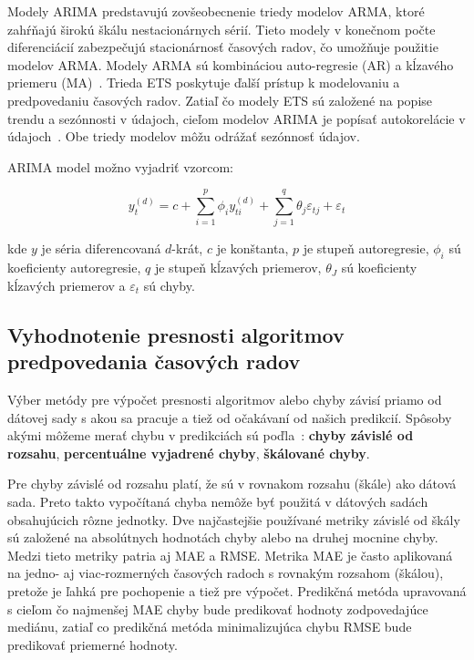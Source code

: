 \documentclass[thesismargins, thesislinespacing, openright, upjsfrontpage, combineabstracts]{rnthesis}
\begin{document}
Modely ARIMA predstavujú zovšeobecnenie triedy modelov ARMA, ktoré zahŕňajú širokú škálu nestacionárnych sérií. Tieto modely v konečnom počte diferenciácií zabezpečujú stacionárnosť časových radov, čo umožňuje použitie modelov ARMA. Modely ARMA sú kombináciou auto-regresie (AR) a kĺzavého priemeru (MA)~\cite{box2015time}. Trieda ETS poskytuje ďalší prístup k modelovaniu a predpovedaniu časových radov. Zatiaľ čo modely ETS sú založené na popise trendu a sezónnosti v údajoch, cieľom modelov ARIMA je popísať autokorelácie v údajoch~\cite{hyndman2018forecasting}. Obe triedy modelov môžu odrážať sezónnosť údajov.

ARIMA model možno vyjadriť vzorcom:
 
\begin{equation}
y_t^{(d)} = c + \sum_{i = 1} ^ {p} \phi_{i} y_{ti}^{(d)} + \sum_{j = 1}^{q} \theta_j \varepsilon_{tj} + \varepsilon_t
\end{equation}
 
kde $y$ je séria diferencovaná $d$-krát, $c$ je konštanta, $p$ je stupeň autoregresie, $\phi_i$ sú koeficienty autoregresie, $q$ je stupeň kĺzavých priemerov, $\theta_J$ sú koeficienty kĺzavých priemerov a $\varepsilon_t$ sú chyby.


\subsection{Vyhodnotenie presnosti algoritmov predpovedania časových radov}

Výber metódy pre výpočet presnosti algoritmov alebo chyby závisí priamo od dátovej sady s akou sa pracuje a tiež od očakávaní od našich predikcií. Spôsoby akými môžeme merať chybu v predikciách sú poďla~\cite{hyndman2018forecasting}:  \textbf{chyby závislé od rozsahu}, \textbf{percentuálne vyjadrené chyby},  \textbf{škálované chyby}. 

Pre chyby závislé od rozsahu platí, že sú v rovnakom rozsahu (škále) ako dátová sada. Preto takto vypočítaná chyba nemôže byť použitá v dátových sadách obsahujúcich rôzne jednotky. Dve najčastejšie používané metriky závislé od škály sú založené na absolútnych hodnotách chyby alebo na druhej mocnine chyby. Medzi tieto metriky patria aj MAE a RMSE. Metrika MAE je často aplikovaná na jedno- aj viac-rozmerných časových radoch s rovnakým rozsahom (škálou), pretože je ľahká pre pochopenie a tiež pre výpočet. Predikčná metóda upravovaná s cieľom čo najmenšej MAE chyby bude predikovať hodnoty zodpovedajúce mediánu, zatiaľ co predikčná metóda minimalizujúca chybu RMSE bude predikovať priemerné hodnoty. 
\end{document}
